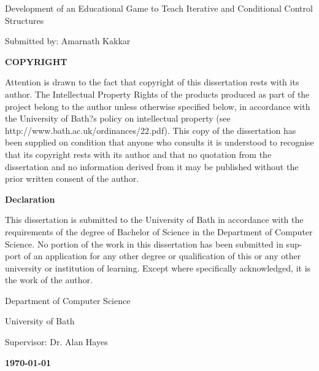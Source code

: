 \documentclass[a4paper,11.5pt]{report}
\numberwithin{figure}{section}
\numberwithin{table}{section}
\numberwithin{equation}{section}
\numberwithin{equation}{section}
\begin{document}
\newpage



    
\clearpage\thispagestyle{empty}
\begin{center}
\begin{minipage}{1\linewidth}
    \vspace{2cm}
    {\LARGE Development of an Educational Game to Teach Iterative and Conditional Control Structures \par}
    \vspace{1cm}	
    {\large Submitted by: Amarnath Kakkar\par}
	
    \vspace{1.5cm}
    {\Large \textbf{COPYRIGHT}\par}
    \vspace{0.5cm}
    {Attention is drawn to the fact that copyright of this dissertation rests with its author. The Intellectual Property Rights of the products produced as part of the project belong to the author unless otherwise specified below, in accordance with the University of Bath?s policy on intellectual property
(see http://www.bath.ac.uk/ordinances/22.pdf).
This copy of the dissertation has been supplied on condition that anyone who consults it is understood to recognise that its copyright rests with its author and that no quotation from the dissertation and no information derived from it may be published without the prior written consent of the author.\par}

     \vspace{0.5cm}
     {\Large \textbf{Declaration}\par}
      \vspace{0.5cm}
      {This dissertation is submitted to the University of Bath in accordance with the requirements of the degree of Bachelor of Science in the Department of Computer Science. No portion of the work in this dissertation has been submitted in sup- port of an application for any other degree or qualification of this or any other university or institution of learning. Except where specifically acknowledged, it is the work of the author.\par}
    
     \vspace{2.5cm}
    {\large Department of Computer Science\par}
    {\large University of Bath\par}
    \vspace{0.5cm}
    {\large Supervisor: Dr. Alan Hayes}\par
    {\large \textbf{\monthyeardate\today}\par}
    \vspace{1cm}
\end{minipage}
\end{center}
\end{document}

